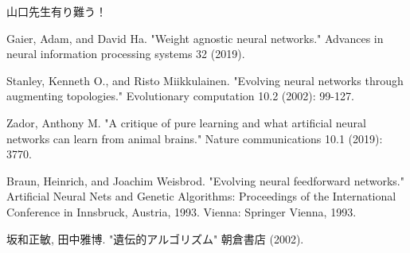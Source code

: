 \documentclass[12pt, dvipdfmx]{jarticle}
\begin{document}

\tableofcontents %
\clearpage %



\clearpage

山口先生有り難う！ %

\begin{thebibliography}{99} %
     Gaier, Adam, and David Ha. "Weight agnostic neural networks." Advances in neural information processing systems 32 (2019).

     Stanley, Kenneth O., and Risto Miikkulainen. "Evolving neural networks through augmenting topologies." Evolutionary computation 10.2 (2002): 99-127.

     Zador, Anthony M. "A critique of pure learning and what artificial neural networks can learn from animal brains." Nature communications 10.1 (2019): 3770.

     Braun, Heinrich, and Joachim Weisbrod. "Evolving neural feedforward networks." Artificial Neural Nets and Genetic Algorithms: Proceedings of the International Conference in Innsbruck, Austria, 1993. Vienna: Springer Vienna, 1993.

     坂和正敏, 田中雅博. "遺伝的アルゴリズム" 朝倉書店 (2002).
\end{thebibliography}
\end{document}

